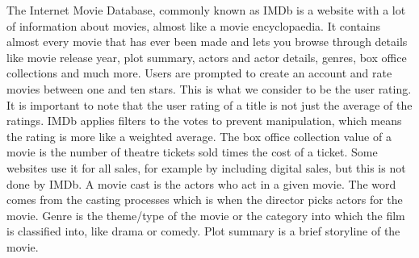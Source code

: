
The Internet Movie Database, commonly known as IMDb is a website with a lot of information about movies, almost like a movie encyclopaedia. It contains almost every movie that has ever been made and lets you browse through details like movie release year, plot summary, actors and actor details, genres, box office collections and much more. Users are prompted to create an account and rate movies between one and ten stars. This is what we consider to be the user rating. It is important to note that the user rating of a title is not just the average of the ratings. IMDb applies filters\cite{IMDbFilters} to the votes to prevent manipulation, which means the rating is more like a weighted average. The box office collection value of a movie is the number of theatre tickets sold times the cost of a ticket. Some websites use it for all sales, for example by including digital sales, but this is not done by IMDb. A movie cast is the actors who act in a given movie. The word comes from the casting processes which is when the director picks actors for the movie. Genre is the theme/type of the movie or the category into which the film is classified into, like drama or comedy. Plot summary is a brief storyline of the movie.